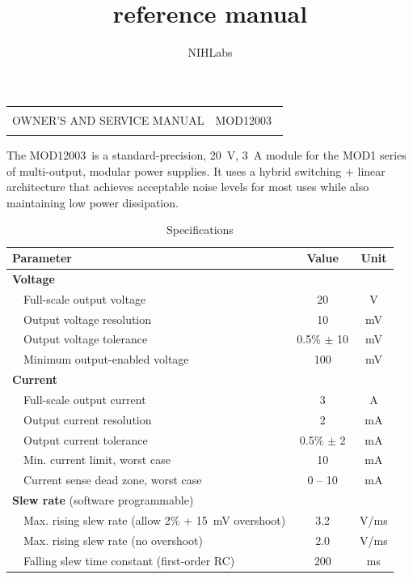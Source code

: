 \documentclass[a4paper,twocolumn,10pt,openany,oneside,final,fleqn]{memoir}
\title{\Model reference manual}
\author{NIHLabs}
\newcommand{\Model}{MOD12003\ }
\begin{document}
\frontmatter

\onecolumn
\begin{titlingpage}
\begin{tabularx}{\textwidth}{Xr}
\hline
\\
{\LARGE OWNER'S AND SERVICE MANUAL} &
\Model \\
\\
\hline
\end{tabularx}
\vfill
\begin{center}
    The \Model is a standard-precision, \SI{20}{V}, \SI{3}{A} module for the
    MOD1 series of multi-output, modular power supplies. It uses a hybrid
    switching + linear architecture that achieves acceptable noise levels for
    most uses while also maintaining low power dissipation.
\end{center}
\vfill
\begin{table}[h]
\centering
\caption{Specifications}
\begin{tabular}{p{2mm}lcc}
    \toprule
    \multicolumn{2}{l}{\textbf{Parameter}} & \textbf{Value} & \textbf{Unit} \\ \midrule
    \multicolumn{2}{l}{\textbf{Voltage}} & & \\ \midrule
    & Full-scale output voltage & 20 & V \\
    & Output voltage resolution & 10 & mV \\
    & Output voltage tolerance  & 0.5\% $\pm$ 10 & mV \\
    & Minimum output-enabled voltage & 100 & mV \\
    \midrule
    \multicolumn{2}{l}{\textbf{Current}} & & \\ \midrule
    & Full-scale output current & 3 & A  \\
    & Output current resolution & 2 & mA \\
    & Output current tolerance  & 0.5\% $\pm$ 2 & mA \\
    & Min. current limit, worst case & 10 & mA \\
    & Current sense dead zone, worst case   & 0 -- 10 & mA \\
    \midrule
    \multicolumn{2}{l}{\textbf{Slew rate} (software programmable)} & & \\ \midrule
    & Max. rising slew rate (allow 2\% + \SI{15}{mV} overshoot) & 3.2 & V/ms \\
    & Max. rising slew rate (no overshoot) & 2.0 & V/ms \\
    & Falling slew time constant (first-order RC) & 200 & ms \\

\end{tabular}
\end{table}
\end{titlingpage}
\end{document}
